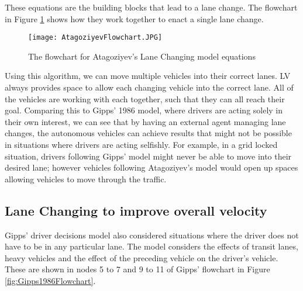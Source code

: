 These equations are the building blocks that lead to a lane change. The flowchart in Figure \ref{fig:AtogoziyevFlowchart} shows how they work together to enact a single lane change.

\begin{figure}[htb]
\texttt{[image: AtagoziyevFlowchart.JPG]}
\caption{The flowchart for Atagoziyev's Lane Changing model equations}
\label{fig:AtogoziyevFlowchart}
\end{figure}

Using this algorithm, we can move multiple vehicles into their correct lanes. LV always provides space to allow each changing vehicle into the correct lane. All of the vehicles are working with each together, such that they can all reach their goal. Comparing this to Gipps' 1986 model, where drivers are acting solely in their own interest, we can see that by having an external agent managing lane changes, the autonomous vehicles can achieve results that might not be possible in situations where drivers are acting selfishly. For example, in a grid locked situation, drivers following Gipps' model might never be able to move into their desired lane; however vehicles following Atagoziyev's model would open up spaces allowing vehicles to move through the traffic.

\subsection{Lane Changing to improve overall velocity}
\label{subsec:Lane Changing to improve overall velocity}
Gipps' driver decisions model also considered situations where the driver does not have to be in any particular lane. The model considers the effects of transit lanes, heavy vehicles and the effect of the preceding vehicle on the driver's vehicle. These are shown in nodes 5 to 7 and 9 to 11 of Gipps' flowchart in Figure \ref{fig:Gipps1986Flowchart}.

